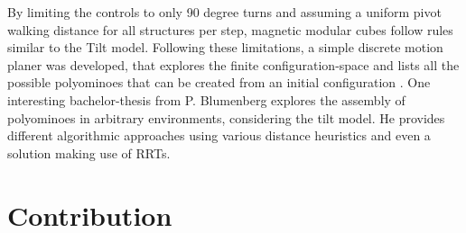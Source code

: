By limiting the controls to only 90 degree turns and assuming a uniform pivot walking distance for all structures per step, magnetic modular cubes follow rules similar to the Tilt model.
Following these limitations, a simple discrete motion planer was developed, that explores the finite configuration-space and lists all the possible polyominoes that can be created from an initial configuration \cite{Becker2022}.
One interesting bachelor-thesis from P. Blumenberg \cite{Blumenberg2022} explores the assembly of polyominoes in arbitrary environments, considering the tilt model.
He provides different algorithmic approaches using various distance heuristics and even a solution making use of RRTs. 

  

\begin{comment}
Different methods for motion planning:

simple discrete planning

sample-based planning

Tilt assembly 

- global control ...
- Applications	
- reconfiguration problem PSPACE Complete

Construction of shapes

- what can be done with complex enviroment
- on tile at a time
- sub-assemblies

Magnetic cubes

- explain cubes with magnets, pivotwalking
- discrete planner
- enumeration of polyominoes, consider fixed polys
\end{comment}



\section{Contribution}
